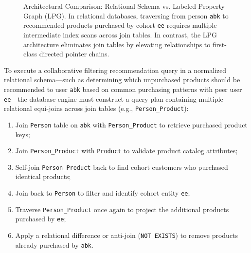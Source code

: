 \documentclass[10pt,twocolumn,letterpaper]{article}
\begin{document}
\begin{figure}[htbp]
\caption{Architectural Comparison: Relational Schema vs. Labeled Property Graph (LPG). In relational databases, traversing from person \texttt{abk} to recommended products purchased by cohort \texttt{ee} requires multiple intermediate index scans across join tables. In contrast, the LPG architecture eliminates join tables by elevating relationships to first-class directed pointer chains.}
\label{fig:relational_vs_graph}
\end{figure}

To execute a collaborative filtering recommendation query in a normalized relational schema---such as determining which unpurchased products should be recommended to user \texttt{abk} based on common purchasing patterns with peer user \texttt{ee}---the database engine must construct a query plan containing multiple relational equi-joins across join tables (e.g., \texttt{Person\_Product}):
\begin{enumerate}
    \item Join \texttt{Person} table on \texttt{abk} with \texttt{Person\_Product} to retrieve purchased product keys;
    \item Join \texttt{Person\_Product} with \texttt{Product} to validate product catalog attributes;
    \item Self-join \texttt{Person\_Product} back to find cohort customers who purchased identical products;
    \item Join back to \texttt{Person} to filter and identify cohort entity \texttt{ee};
    \item Traverse \texttt{Person\_Product} once again to project the additional products purchased by \texttt{ee};
    \item Apply a relational difference or anti-join (\texttt{NOT EXISTS}) to remove products already purchased by \texttt{abk}.
\end{enumerate}
\end{document}
